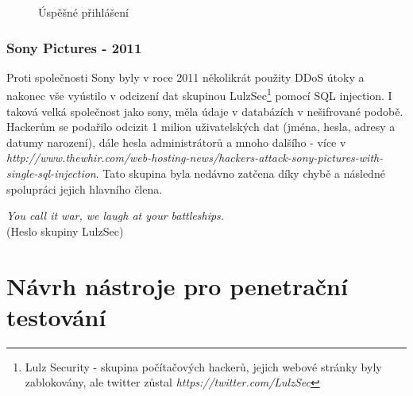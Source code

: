 \documentclass[12pt, a4paper]{report}
\begin{document}
\begin{figure}[h!]
\caption{Úspěšné přihlášení}
\label{obr.login2}
\end{figure}


\subsection{Sony Pictures - 2011}
Proti společnosti Sony byly v roce 2011 několikrát použity DDoS útoky a nakonec vše vyústilo v odcizení dat skupinou LulzSec\footnote{Lulz Security - skupina počítačových hackerů, jejich webové stránky byly zablokovány, ale twitter zůstal \textit{https://twitter.com/LulzSec}} pomocí SQL injection. I taková velká společnost jako sony, měla údaje v databázích v nešifrované podobě. Hackerům se podařilo odcizit 1 milion uživatelských dat (jména, hesla, adresy a datumy narození), dále hesla administrátorů a mnoho dalšího - více v \textit{http://www.thewhir.com/web-hosting-news/hackers-attack-sony-pictures-with-single-sql-injection}. Tato skupina byla nedávno zatčena díky chybě a následné spolupráci jejich hlavního člena.

\begin{center}
\textit{You call it war, we laugh at your battleships.}\\
(Heslo skupiny LulzSec)
\end{center}

\chapter{Návrh nástroje pro penetrační testování}
\end{document}
